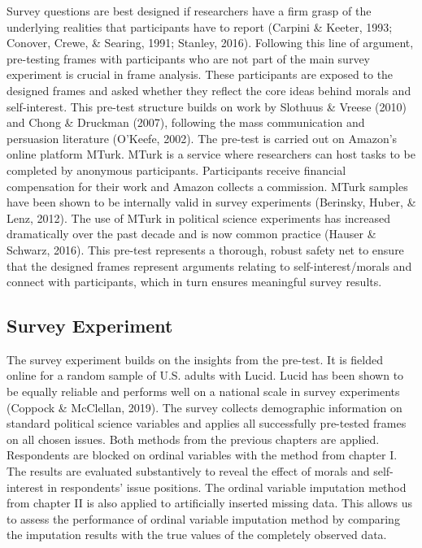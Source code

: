 \documentclass[12pt,econ]{sources/authesis}
\begin{document}
Survey questions are best designed if researchers have a firm grasp of the underlying realities that participants have to report (Carpini \& Keeter, 1993; Conover, Crewe, \& Searing, 1991; Stanley, 2016). Following this line of argument, pre-testing frames with participants who are not part of the main survey experiment is crucial in frame analysis. These participants are exposed to the designed frames and asked whether they reflect the core ideas behind morals and self-interest. This pre-test structure builds on work by Slothuus \& Vreese (2010) and Chong \& Druckman (2007), following the mass communication and persuasion literature (O'Keefe, 2002). The pre-test is carried out on Amazon's online platform MTurk. MTurk is a service where researchers can host tasks to be completed by anonymous participants. Participants receive financial compensation for their work and Amazon collects a commission. MTurk samples have been shown to be internally valid in survey experiments (Berinsky, Huber, \& Lenz, 2012). The use of MTurk in political science experiments has increased dramatically over the past decade and is now common practice (Hauser \& Schwarz, 2016). This pre-test represents a thorough, robust safety net to ensure that the designed frames represent arguments relating to self-interest/morals and connect with participants, which in turn ensures meaningful survey results.

\hypertarget{framing-data-survey}{%
\subsection{Survey Experiment}\label{framing-data-survey}}

The survey experiment builds on the insights from the pre-test. It is fielded online for a random sample of U.S. adults with Lucid. Lucid has been shown to be equally reliable and performs well on a national scale in survey experiments (Coppock \& McClellan, 2019). The survey collects demographic information on standard political science variables and applies all successfully pre-tested frames on all chosen issues. Both methods from the previous chapters are applied. Respondents are blocked on ordinal variables with the method from chapter I. The results are evaluated substantively to reveal the effect of morals and self-interest in respondents' issue positions. The ordinal variable imputation method from chapter II is also applied to artificially inserted missing data. This allows us to assess the performance of ordinal variable imputation method by comparing the imputation results with the true values of the completely observed data.
\end{document}
